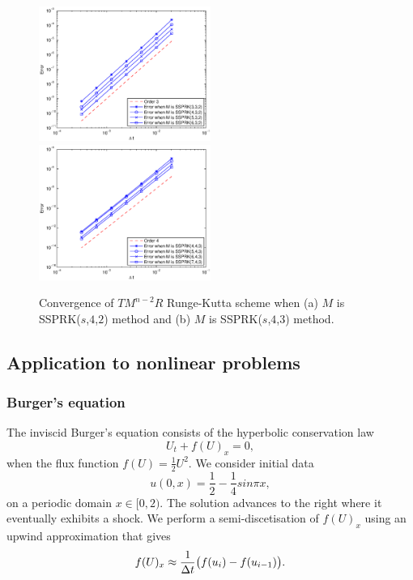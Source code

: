 \begin{figure}[t!]
    \centering
    \includegraphics[width=0.5\textwidth]{Pictures/convergence_3rd_ord}%
    \includegraphics[width=0.5\textwidth]{Pictures/convergence_4th_ord_(2)}
    \caption{Convergence of $TM^{n-2}R$ Runge-Kutta scheme when (a) $M$ is SSPRK($s $,$ 4 $,$ 2 $) method and (b) $ M $ is SSPRK($ s $,$ 4 $,$ 3 $) method.}
    \label{fig5.2}
\end{figure}

\subsection{Application to nonlinear problems}\label{subsec:nonlinear_problems}

\subsubsection{Burger's equation}\label{subsubsec:burgers}

The inviscid Burger's equation consists of the hyperbolic conservation law
\begin{equation}\label{eq5.5}
    U_{t} + f(U)_{x} = 0,
\end{equation}
when the flux function $f(U) = \frac{1}{2}U^{2}$. We consider initial data
\begin{equation}\label{eq5.6}
    u(0,x)  = \frac{1}{2} - \frac{1}{4}sin{\pi x},
\end{equation}
on a periodic domain $x \in [0,2)$. The solution advances to the right where it eventually exhibits a shock. We perform a semi-discetisation of $f(U)_{x}$ using an upwind approximation \cite{Ketcheson2009} that gives
\begin{equation}\label{eq5.7}
    f(U)_{x} \approx \frac{1}{\Delta t}\bigl(f(u_{i}) - f(u_{i-1})\bigr).
\end{equation}

